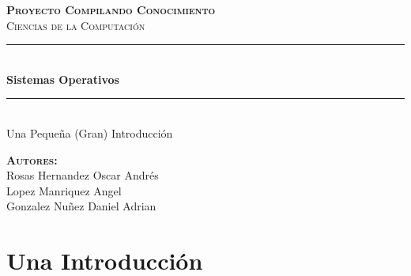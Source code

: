 \documentclass[12pt, fleqn]{report}                             %
\author{Oscar Andrés Rosas}                                     %
\begin{document}
\begin{titlepage}

    \center
    \textbf{\textsc{\Large Proyecto Compilando Conocimiento}}\\[1.0cm] 
    \textsc{\Large Ciencias de la Computación}\\[1.0cm] 

    \rule{\linewidth}{0.5mm} \\[1.0cm]
        { \huge \bfseries Sistemas Operativos}\\[1.0cm] 
    \rule{\linewidth}{0.5mm} \\[2.0cm]
    
    {\LARGE Una Pequeña (Gran) Introducción}\\[7cm] 
    
    \begin{center} \large
    \textbf{\textsc{Autores:}}\\
        Rosas Hernandez Oscar Andrés    \\
        Lopez Manriquez Angel           \\
        Gonzalez Nuñez Daniel Adrian
    \end{center}

    \vfill

\end{titlepage}

\tableofcontents{}
\label{sec:Index}

\clearpage




\part{Una Introducción}
\clearpage


\end{document}
